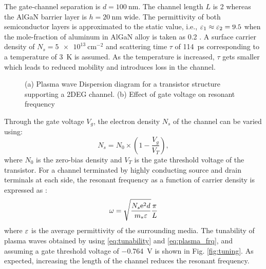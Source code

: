 The gate-channel separation is $d = \SI{100}{\nm}$. The channel length $L$ is \SI{2}{\micm} whereas the AlGaN barrier layer is $h = \SI{20}{\nm}$ wide.
The permittivity of both semiconductor layers is approximated to the static value, i.e., $\varepsilon_1 \approx \varepsilon_2 = 9.5$ when the mole-fraction of aluminum in AlGaN alloy is taken as \SI{.2}{} \cite{Muravjov2010}. A surface carrier density of $N_s = \SI{5e13}{\cm^{-2}}$ and scattering time $\tau$ of \SI{114}{\ps} corresponding to a temperature of \SI{3}{\kelvin} is assumed. As the temperature is increased, $\tau$ gets smaller which leads to reduced mobility and introduces loss in the channel.
%
\begin{figure}[t!]
      \hfil
  \caption{(a) Plasma wave Dispersion diagram for a transistor structure supporting a 2DEG channel. (b) Effect of gate voltage on resonant frequency}
  \label{fig:matlab_simulation}
\end{figure}
%
Through the gate voltage $V_g$, the electron density $N_s$ of the channel can be varied using:
%
\begin{equation}
  N_s = N_0 \times \left(1 - \frac{V_g}{V_T} \right),
  \label{eq:tunability}
\end{equation}
%
where $N_0$ is the zero-bias density and $V_T$ is the gate threshold voltage of the transistor. For a channel terminated by highly conducting source and drain terminals at each side, the resonant frequency as a function of carrier density is expressed as \cite{Popov2008}:
%
\begin{equation}
  \omega = \sqrt{\frac{N_s \mathrm{e}^2 d}{m_{\ast} \varepsilon}} \frac{\pi}{L}
  \label{eq:plasma_frq}
\end{equation}
%
where $\varepsilon$ is the average permittivity of the surrounding media. The tunability of plasma waves obtained by using \eqref{eq:tunability} and \eqref{eq:plasma_frq}, and assuming a gate threshold voltage of \SI{-.764}{\volt} is shown in Fig. \ref{fig:tuning}. As expected, increasing the length of the channel reduces the resonant frequency.
%
%
%
